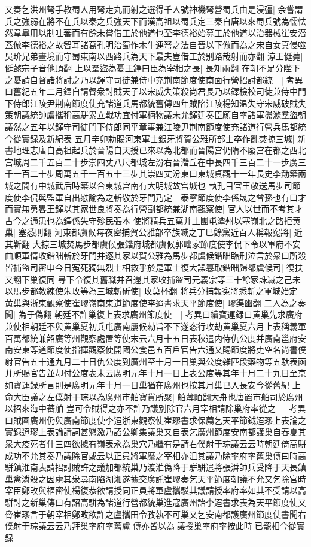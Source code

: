 又奏乞洪州弩手教蜀人用弩走丸而射之選得千人號神機弩營蜀兵由是浸彊|{
	余嘗謂兵之強弱在將不在兵以秦之兵強天下而漢高祖以蜀兵定三秦自唐以來蜀兵號為懦怯然韋臯用以制吐蕃而有餘未嘗借工於他道也至李德裕始募工於他道以治器械崔安潜蓋倣李德裕之故智耳諸葛孔明治蜀作木牛連弩之法自晉以下倣而為之宋自女真侵噬吳玠兄弟畫境而守蜀東南以西路兵為天下最夫豈借工於别路哉射而亦翻}
涼王侹薨|{
	侹懿宗子音他頂翻}
上以羣盜為憂王鐸曰臣為宰相之長|{
	長知兩翻}
在朝不足分陛下之憂請自督諸將討之乃以鐸守司徒兼侍中充荆南節度使南面行營招討都統　|{
	考異曰舊紀五年二月鐸自請督衆討賊天子以宋威失策殺尚君長乃以鐸檢校司徒兼侍中門下侍郎江陵尹荆南節度使充諸道兵馬都統舊傳四年賊陷江陵楊知温失守宋威破賊失策朝議統帥盧攜稱高駢累立戰功宜付軍柄物議未允鐸廷奏臣願自率諸軍盪滌羣盜朝議然之五年以鐸守司徒門下侍郎同平章事兼江陵尹荆南節度使充諸道行營兵馬都統今從實録及新紀表}
五月辛卯勅賜河東軍士銀牙將賀公雅所部士卒作亂焚掠三城|{
	新書地理志唐自高祖起兵於晉陽自天授已來以為北都而晉陽宫仍隋不廢宫在都之西北宫城周二千五百二十步崇四丈八尺都城左汾右晉濳丘在中長四千三百二十一步廣三千一百二十步周萬五千一百五十三步其崇四丈汾東曰東城貞觀十一年長史李勣築兩城之間有中城武后時築以合東城宫南有大明城故宫城也}
執孔目官王敬送馬步司節度使李侃與監軍自出慰諭為之斬敬於牙門乃定　泰寧節度使李係晟之曾孫也有口才而實無勇畧王鐸以其家世良將奏為行營副都統兼湖南觀察使|{
	官人以世而不考其才古今之通患也為鐸係失守殄民張本}
使將精兵五萬并土團屯潭州以塞嶺北之路拒黄巢|{
	塞悉則翻}
河東都虞候每夜密捕賀公雅部卒族㓕之丁巳餘黨近百人稱報寃將|{
	近其靳翻}
大掠三城焚馬步都虞候張鍇府城都虞候郭昢家節度使李侃下令以軍府不安曲順軍情收鍇昢斬於牙門并逐其家以賀公雅為馬步都虞候鍇昢臨刑泣言於衆曰所殺皆捕盜司密申今日寃死獨無烈士相救乎於是軍士復大譟簒取鍇昢歸都虞候司|{
	復扶又翻下巢復同}
尋下令復其舊職并召還其家收捕盜司元義宗等三十餘家誅㓕之己未以馬步都教練使朱玫等為三城斬斫使|{
	玫莫杯翻}
將兵分捕報寃將悉斬之軍城始定　黄巢與浙東觀察使崔璆嶺南東道節度使李迢書求天平節度使|{
	璆渠幽翻}
二人為之奏聞|{
	為于偽翻}
朝廷不許巢復上表求廣州節度使　|{
	考異曰續寶運録曰黄巢先求廣府兼使相朝廷不與黄巢夏初兵屯廣南屢候勑旨不下遂恣行攻劫黄巢夏六月上表稱義軍百萬都統兼韶廣等州觀察處置等使末云六月十五日表秋遣内侍仇公度并廣南邕府安南安東等道節度使指揮觀察使開國公食邑五百戶官告六通又賜節度將吏空名尚書僕射官告五十通九月二十日仇公度到廣州至十月一日巢與公度雜匹段藥物等五馱表函并所賜官告並却付公度表末云廣明元年十月一日上表公度等其年十月二十九日至京如寶運録所言則是廣明元年十月一日巢猶在廣州也按其月巢已入長安今從舊紀}
上命大臣議之左僕射于琮以為廣州市舶寶貨所聚|{
	舶薄陌翻大舟也唐置市舶司於廣州以招來海中蕃舶}
豈可令賊得之亦不許乃議别除官六月宰相請除巢府率從之　|{
	考異曰賊圍廣州仍與廣南節度使李迢浙東觀察使崔璆書求保薦乞天平節鉞迢璆上表論之實録迢璆上表論請詞甚懇激乃詔公卿集議巢又自表乞廣州節度安南都護巢自春夏其衆大疫死者什三四欲㨿有嶺表永為巢穴乃繼有是請右僕射于琮議云云時朝廷倚高駢成功不允其奏乃議除官或云以正員將軍縻之宰相亦沮其議乃除率府率舊巢傳曰時高駢鎮淮南表請招討賊許之議加都統巢乃渡淮偽降于駢駢遣將張潾帥兵受降于天長鎮巢禽潾殺之因虜其衆尋南陷湖湘遂據交廣託崔璆奏乞天平節度朝議不允又乞除官時宰臣鄭畋與樞密使楊復恭欲請授同正員將軍盧攜駁其議請授率府率如其不受請以高駢討之新巢傳曰有詔高駢為諸道行營都統巢進寇廣州詒李迢書求表為天平節度使又脅崔璆言于朝宰相鄭畋欲許之盧攜田令孜執不可巢又乞安南都護廣州節度使書聞右僕射于琮議云云乃拜巢率府率舊盧傳亦皆以為議授巢率府率按此時已罷相今從實録}
